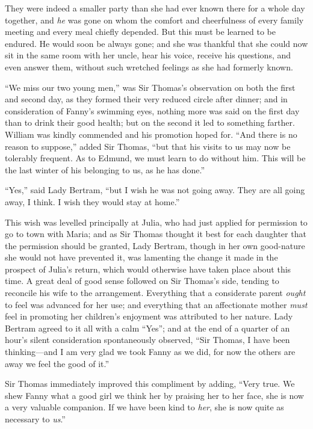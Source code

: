 \documentclass{article}
\begin{document}
They were indeed a smaller party than she had ever
known there for a whole day together, and \emph{he} was gone
on whom the comfort and cheerfulness of every family
meeting and every meal chiefly depended.  But this must
be learned to be endured.  He would soon be always gone;
and she was thankful that she could now sit in the same room
with her uncle, hear his voice, receive his questions,
and even answer them, without such wretched feelings
as she had formerly known.

``We miss our two young men,'' was Sir Thomas's observation
on both the first and second day, as they formed their
very reduced circle after dinner; and in consideration
of Fanny's swimming eyes, nothing more was said
on the first day than to drink their good health;
but on the second it led to something farther.
William was kindly commended and his promotion hoped for.
``And there is no reason to suppose,'' added Sir Thomas,
``but that his visits to us may now be tolerably frequent.
As to Edmund, we must learn to do without him.
This will be the last winter of his belonging to us,
as he has done.''

``Yes,'' said Lady Bertram, ``but I wish he was not going away.
They are all going away, I think.  I wish they would stay
at home.''

This wish was levelled principally at Julia, who had
just applied for permission to go to town with Maria;
and as Sir Thomas thought it best for each daughter that the
permission should be granted, Lady Bertram, though in her own
good-nature she would not have prevented it, was lamenting
the change it made in the prospect of Julia's return,
which would otherwise have taken place about this time.
A great deal of good sense followed on Sir Thomas's side,
tending to reconcile his wife to the arrangement.
Everything that a considerate parent \emph{ought} to feel was
advanced for her use; and everything that an affectionate
mother \emph{must} feel in promoting her children's enjoyment
was attributed to her nature.  Lady Bertram agreed to it
all with a calm ``Yes''; and at the end of a quarter of
an hour's silent consideration spontaneously observed,
``Sir Thomas, I have been thinking---and I am very glad we
took Fanny as we did, for now the others are away we feel
the good of it.''

Sir Thomas immediately improved this compliment by adding,
``Very true.  We shew Fanny what a good girl we think
her by praising her to her face, she is now a very
valuable companion.  If we have been kind to \emph{her},
she is now quite as necessary to \emph{us}.''
\end{document}

